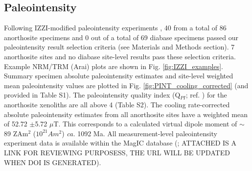 \documentclass[9pt,twocolumn,twoside,lineno]{pnas-new}
\begin{document}
\subsection*{Paleointensity}

Following IZZI-modified paleointensity experiments \cite{Yu2004a}, 40 from a total of 86 anorthosite specimens and 0 out of a total of 69 diabase specimens passed our paleointensity result selection criteria (see Materials and Methods section). 7 anorthosite sites and no diabase site-level results pass these selection criteria. Example NRM/TRM (Arai) plots are shown in Fig. \ref{fig:IZZI_examples}. Summary specimen absolute paleointensity estimates and site-level weighted mean paleointensity values are plotted in Fig. \ref{fig:PINT_cooling_corrected} (and provided in Table S1). The paleointensity quality index (Q$_{PI}$; ref. \citealp{Biggin2014a}) for the anorthosite xenoliths are all above 4 (Table S2). The cooling rate-corrected absolute paleointensity estimates from all anorthosite sites have a weighted mean of 52.72 $\pm $5.72 $\mu$T. This corresponds to a calculated virtual dipole moment of $\sim$89 ZAm$^2$ ($10^{21} Am^2$) \textit{ca.} 1092 Ma. All measurement-level paleointensity experiment data is available within the MagIC database (\url{}; ATTACHED IS A LINK FOR REVIEWING PURPOSESS, THE URL WILL BE UPDATED WHEN DOI IS GENERATED). 
\end{document}
